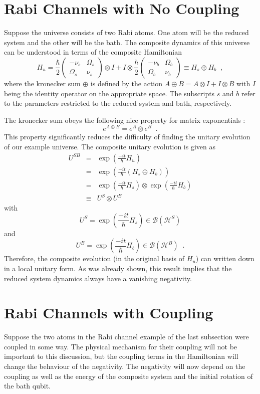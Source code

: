 \section{Rabi Channels with No Coupling}
\label{sec:rabinocoup}
Suppose the universe consists of two Rabi atoms.  One atom will be the reduced system and the other will be the bath.  The composite dynamics of this universe can be understood in terms of the composite Hamiltonian
$$
H_u = \frac{\hbar}{2}\begin{pmatrix}
-\nu_s & \Omega_s\\
\Omega_s & \nu_s
\end{pmatrix}\otimes I + I\otimes \frac{\hbar}{2}\begin{pmatrix}
-\nu_b & \Omega_b\\
\Omega_b & \nu_b
\end{pmatrix} \equiv H_s \oplus H_b\;\;,
$$
where the kronecker sum $\oplus$ is defined by the action $A\oplus B=A\otimes I+ I\otimes B$ with $I$ being the identity operator on the appropriate space.  The subscripts $s$ and $b$ refer to the parameters restricted to the reduced system and bath, respectively.

The kronecker sum obeys the following nice property for matrix exponentials \cite{Horn1990}:
$$
e^{A\oplus B} = e^A\otimes e^B\;\;.
$$
This property significantly reduces the difficulty of finding the unitary evolution of our example universe.  The composite unitary evolution is given as
\begin{eqnarray*}
U^{SB} &=& \exp\left(\frac{-it}{\hbar} H_u\right)\\
&=& \exp\left(\frac{-it}{\hbar} \left(H_s \oplus H_b\right)\right)\\
&=& \exp\left(\frac{-it}{\hbar} H_s \right) \otimes \exp\left(\frac{-it}{\hbar} H_b\right)\\
&\equiv & U^S\otimes U^B
\end{eqnarray*}
with
$$
U^S = \exp\left(\frac{-it}{\hbar} H_s \right) \in\mathcal{B}\left(\mathcal{H}^S\right)
$$
and
$$
U^B = \exp\left(\frac{-it}{\hbar} H_b \right) \in\mathcal{B}\left(\mathcal{H}^B\right)\;\;.
$$
Therefore, the composite evolution (in the original basis of $H_u$) can written down in a local unitary form.  As was already shown, this result implies that the reduced system dynamics always have a vanishing negativity.

\section{Rabi Channels with Coupling}
\label{sec:rabisub}
Suppose the two atoms in the Rabi channel example of the last subsection were coupled in some way.  The physical mechanism for their coupling will not be important to this discussion, but the coupling terms in the Hamiltonian will change the behaviour of the negativity.  The negativity will now depend on the coupling as well as the energy of the composite system and the initial rotation of the bath qubit.

